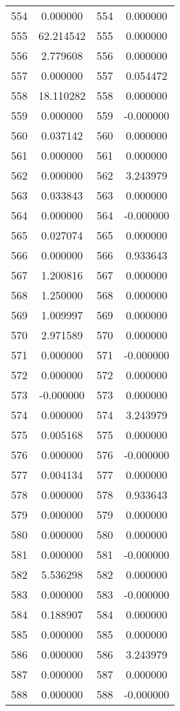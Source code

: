 \documentclass[12pt]{article}
\begin{document}
\begin{longtable}{@{}cccc@{}}
554 & 0.000000 & 554 & 0.000000 \\
555 & 62.214542 & 555 & 0.000000 \\
556 & 2.779608 & 556 & 0.000000 \\
557 & 0.000000 & 557 & 0.054472 \\
558 & 18.110282 & 558 & 0.000000 \\
559 & 0.000000 & 559 & -0.000000 \\
560 & 0.037142 & 560 & 0.000000 \\
561 & 0.000000 & 561 & 0.000000 \\
562 & 0.000000 & 562 & 3.243979 \\
563 & 0.033843 & 563 & 0.000000 \\
564 & 0.000000 & 564 & -0.000000 \\
565 & 0.027074 & 565 & 0.000000 \\
566 & 0.000000 & 566 & 0.933643 \\
567 & 1.200816 & 567 & 0.000000 \\
568 & 1.250000 & 568 & 0.000000 \\
569 & 1.009997 & 569 & 0.000000 \\
570 & 2.971589 & 570 & 0.000000 \\
571 & 0.000000 & 571 & -0.000000 \\
572 & 0.000000 & 572 & 0.000000 \\
573 & -0.000000 & 573 & 0.000000 \\
574 & 0.000000 & 574 & 3.243979 \\
575 & 0.005168 & 575 & 0.000000 \\
576 & 0.000000 & 576 & -0.000000 \\
577 & 0.004134 & 577 & 0.000000 \\
578 & 0.000000 & 578 & 0.933643 \\
579 & 0.000000 & 579 & 0.000000 \\
580 & 0.000000 & 580 & 0.000000 \\
581 & 0.000000 & 581 & -0.000000 \\
582 & 5.536298 & 582 & 0.000000 \\
583 & 0.000000 & 583 & -0.000000 \\
584 & 0.188907 & 584 & 0.000000 \\
585 & 0.000000 & 585 & 0.000000 \\
586 & 0.000000 & 586 & 3.243979 \\
587 & 0.000000 & 587 & 0.000000 \\
588 & 0.000000 & 588 & -0.000000 \\

\end{longtable}
\end{document}
